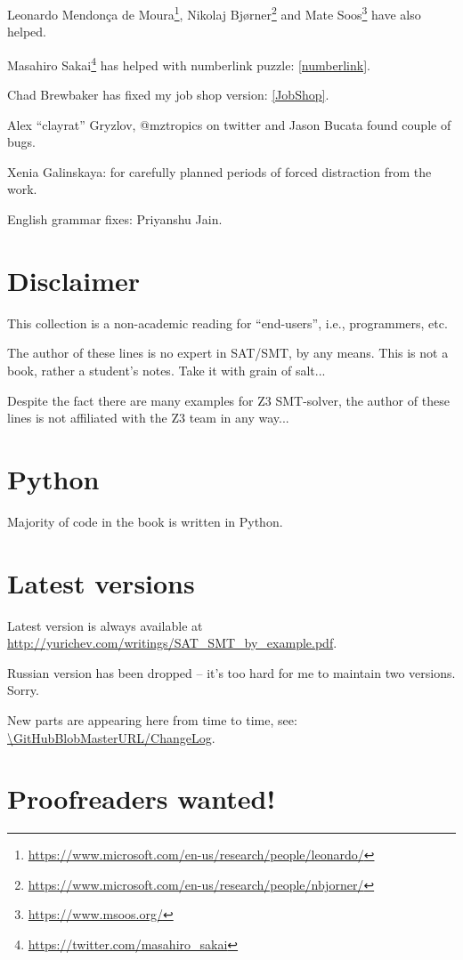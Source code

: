 Leonardo Mendonça de Moura\footnote{\url{https://www.microsoft.com/en-us/research/people/leonardo/}},
Nikolaj Bjørner\footnote{\url{https://www.microsoft.com/en-us/research/people/nbjorner/}}
and Mate Soos\footnote{\url{https://www.msoos.org/}} have also helped.

Masahiro Sakai\footnote{\url{https://twitter.com/masahiro_sakai}} has helped with numberlink puzzle: \ref{numberlink}.

Chad Brewbaker has fixed my job shop version: \ref{JobShop}.

Alex ``clayrat'' Gryzlov, @mztropics on twitter and Jason Bucata found couple of bugs.

Xenia Galinskaya: for carefully planned periods of forced distraction from the work.

English grammar fixes: Priyanshu Jain.

\section{Disclaimer}

This collection is a non-academic reading for ``end-users'', i.e., programmers, etc.

The author of these lines is no expert in SAT/SMT, by any means.
This is not a book, rather a student's notes.
Take it with grain of salt...

Despite the fact there are many examples for Z3 SMT-solver,
the author of these lines is not affiliated with the Z3 team in any way...

\section{Python}

Majority of code in the book is written in Python.

\section{Latest versions}

Latest version is always available at \url{http://yurichev.com/writings/SAT_SMT_by_example.pdf}.

Russian version has been dropped -- it's too hard for me to maintain two versions. Sorry.

New parts are appearing here from time to time, see: \url{\GitHubBlobMasterURL/ChangeLog}.

\section{Proofreaders wanted!}

